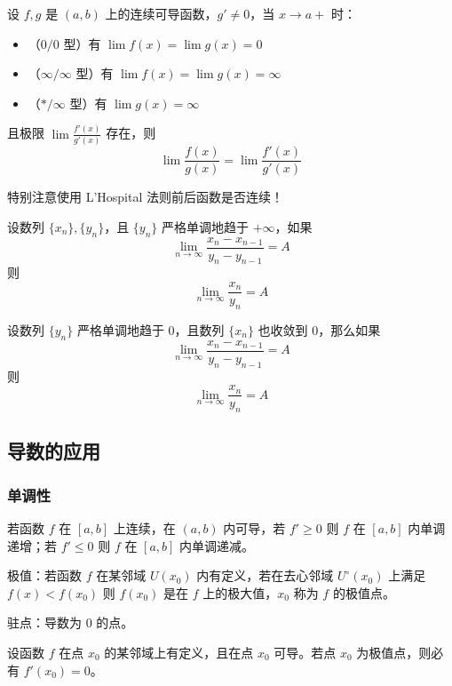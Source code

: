 \begin{theorem}[L'Hospital 法则]
	设 $f,g$ 是 $(a,b)$ 上的连续可导函数，$g' \neq 0$，当 $x \to a+$ 时：
	\begin{itemize}
		\item （$0/0$ 型）有 $\lim f(x) = \lim g(x) = 0$
		\item （$\infty/\infty$ 型）有 $\lim f(x) = \lim g(x) = \infty$
		\item （$\ast/\infty$ 型）有 $\lim g(x) = \infty$
	\end{itemize}
	且极限 $\lim \frac{f'(x)}{g'(x)}$ 存在，则
	\[ \lim \frac{f(x)}{g(x)} = \lim \frac{f'(x)}{g'(x)} \]
\end{theorem}

\begin{note}
	特别注意使用 L'Hospital 法则前后函数是否连续！
\end{note}

\begin{theorem}
	设数列 $\{x_n\},\{y_n\}$，且 $\{y_n\}$ 严格单调地趋于 $+\infty$，如果
	\[\lim_{n\to \infty}\frac{x_n-x_{n-1}}{y_n-y_{n-1}}=A\]
	则
	\[\lim_{n\to \infty} \frac{x_n}{y_n} = A\]
\end{theorem}

\begin{theorem}
	设数列 $\{y_n\}$ 严格单调地趋于 $0$，且数列 $\{x_n\}$ 也收敛到 $0$，那么如果
	\[\lim_{n\to \infty}\frac{x_n-x_{n-1}}{y_n-y_{n-1}}=A\]
	则
	\[\lim_{n\to \infty} \frac{x_n}{y_n} = A\]
\end{theorem}

\subsection{导数的应用}

\subsubsection*{单调性}

若函数 $f$ 在 $[a, b]$ 上连续，在 $(a, b)$ 内可导，若 $f' \geqslant 0$ 则 $f$ 在 $[a, b]$ 内单调递增；若 $f' \leqslant 0$ 则 $f$ 在 $[a, b]$ 内单调递减。

极值：若函数 $f$ 在某邻域 $U(x_0)$ 内有定义，若在去心邻域 $U^\circ(x_0)$ 上满足 $f(x) < f(x_0)$ 则 $f(x_0)$ 是在 $f$ 上的极大值，$x_0$ 称为 $f$ 的极值点。

驻点：导数为 $0$ 的点。

\begin{theorem}[Fermat 定理]
	设函数 $f$ 在点 $x_0$ 的某邻域上有定义，且在点 $x_0$ 可导。若点 $x_0$ 为极值点，则必有 $f'(x_0)=0$。
\end{theorem}

